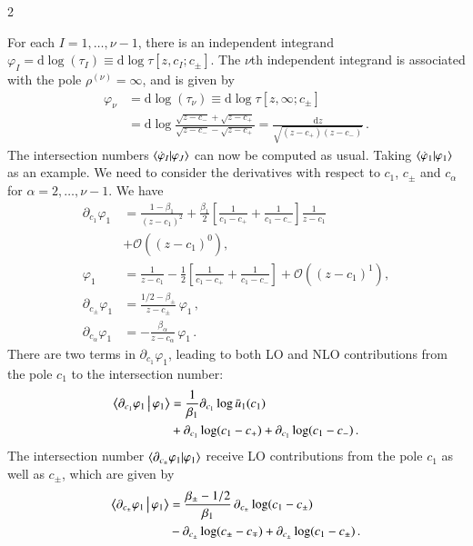 \documentclass[fleqn]{2023SCGE}
\newcommand{\nn}{\nonumber}
\newcommand{\nd}{\mathrm{d}}
\begin{document}
\begin{multicols}{2}
\begin{appendix}
For each $I=1,\ldots,\nu-1$, there is an independent integrand $\varphi_I = \nd\log(\tau_I) \equiv \nd \log \tau[z,c_I;c_{\pm}]$. The $\nu$th independent integrand is associated with the pole $\rho^{(\nu)} = \infty$, and is given by
\begin{align}
    \varphi_\nu &= \nd\log(\tau_\nu) \equiv \nd\log \tau[z,\infty;c_\pm] \nn\\
    &= \nd\log \frac{\sqrt{z-c_-}+\sqrt{z-c_+}}{\sqrt{z-c_-}-\sqrt{z-c_+}} 
    = \frac{\nd z}{\sqrt{(z-c_+)(z-c_-)}} \,.
    \label{eq:tau_nu}
 \end{align}
The intersection numbers $\braket{\dot{\varphi}_I | \varphi_J}$ can now be computed as usual. Taking $\braket{\dot{\varphi}_1 | \varphi_1}$ as an example. We need to consider the derivatives with respect to $c_1$, $c_\pm$ and $c_\alpha$ for $\alpha=2,\ldots,\nu-1$. We have
\begin{align}
    \partial_{c_1} \varphi_1 &= \frac{1-\beta_1}{(z-c_1)^2} + \frac{\beta_1}{2} \left[ \frac{1}{c_1-c_+} + \frac{1}{c_1-c_-} \right] \frac{1}{z-c_1} \nn\\
    &+ \mathcal{O}\left((z-c_1)^0\right) , \nn
    \\
    \varphi_1 &= \frac{1}{z-c_1} - \frac{1}{2} \left[ \frac{1}{c_1-c_+} + \frac{1}{c_1-c_-} \right] + \mathcal{O}\left((z-c_1)^1\right) , \nn
    \\
    \partial_{c_\pm} \varphi_1 &= \frac{1/2-\beta_\pm}{z-c_\pm} \, \varphi_1 \,, \nn
    \\
    \partial_{c_\alpha} \varphi_1 &= -\frac{\beta_\alpha}{z-c_\alpha} \, \varphi_1 \,.
\end{align}
There are two terms in $\partial_{c_1} \varphi_1$, leading to both LO and NLO contributions from the pole $c_1$ to the intersection number:
\begin{align}
    \Braket{\partial_{c_1} \varphi_1 | \varphi_1} &= \frac{1}{\beta_1} \partial_{c_1} \log\bar{u}_1(c_1) \nn\\
    & + \partial_{c_1} \log(c_1-c_+) + \partial_{c_1} \log(c_1-c_-) \,.
\end{align}
The intersection number $\braket{\partial_{c_\pm} \varphi_1 | \varphi_1}$ receive LO contributions from the pole $c_1$ as well as $c_\pm$, which are given by
\begin{align}
    \Braket{\partial_{c_\pm} \varphi_1 | \varphi_1} &=  \frac{\beta_\pm - 1/2}{\beta_1} \, \partial_{c_\pm} \log(c_1-c_\pm) \nn\\
    &- \partial_{c_\pm} \log(c_\pm-c_\mp) + \partial_{c_\pm}\log(c_1-c_\pm) \,.

\end{align}
\end{appendix}
\end{multicols}
\end{document}

